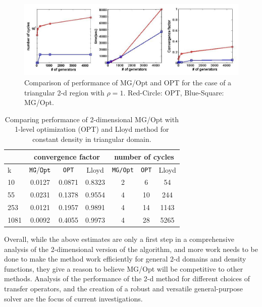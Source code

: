 \documentclass{siamltex}
\begin{document}
\begin{figure}[h]
\centering
  \includegraphics[width=1.0\textwidth]{comp_opt_mg_low1.jpg}
  \caption{Comparison of performance of MG/Opt and OPT  for the case of a triangular 2-d %
  region with $\rho=1$. Red-Circle: OPT, Blue-Square: MG/Opt.} %
\label{fig:2d_comp}
\end{figure}

\begin{table}
\begin{center}
\begin{tabular}{| l |c | c | c | c  |c|c|} \hline
 &\multicolumn{3}{|c|}{convergence factor} &\multicolumn{3}{|c|}{number of cycles }\\ \hline
k &${\tt MG/Opt}$&{\tt OPT}&Lloyd & {\tt MG/Opt} &{\tt OPT}&Lloyd \\ \hline
10 & 0.0127 & 0.0871 & 0.8323 & 2& 6 & 54 \\ \hline
55 &0.0231 & 0.1378&0.9554& 4& 10& 244 \\ \hline
253 &0.0121 & 0.1957&0.9891& 4& 14& 1143 \\ \hline
1081 &0.0092 & 0.4055&0.9973& 4& 28& 5265 \\ \hline
 \end{tabular} 
\end{center}
\caption{Comparing performance of 2-dimensional MG/Opt with 1-level optimization (OPT) and Lloyd method for constant density in triangular domain. }
\label{mytable2}
\end{table}

Overall, while the above estimates are only a first step in a comprehensive analysis of the %
2-dimensional version of the algorithm, and more work needs to be done to make the method work efficiently for general 2-d domains and density functions,  they give a reason to believe MG/Opt will be %
competitive to other methods. Analysis of the performance of the 2-d method for different choices %
of transfer operators, and the creation of a robust and versatile general-purpose solver are the %
focus of current investigations.
\end{document}
